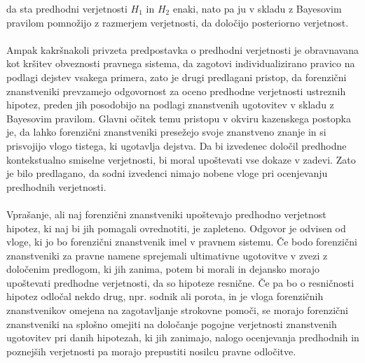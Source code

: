 \documentclass[12pt,a4paper]{amsart}
\theoremstyle{definition} %
\theoremstyle{plain} %
\begin{document}
da sta predhodni verjetnosti $H_1$ in $H_2$ enaki, nato pa ju v skladu z Bayesovim pravilom pomnožijo z razmerjem verjetnosti, da določijo posteriorno 
verjetnost. \\\\
Ampak kakršnakoli privzeta predpostavka o predhodni verjetnosti je obravnavana kot kršitev obveznosti pravnega sistema, da zagotovi individualizirano 
pravico na podlagi dejstev vsakega primera, zato je drugi predlagani pristop, da forenzični znanstveniki prevzamejo odgovornost za oceno predhodne 
verjetnosti ustreznih hipotez, preden jih posodobijo na podlagi znanstvenih ugotovitev v skladu z Bayesovim pravilom. Glavni očitek temu pristopu v 
okviru kazenskega postopka je, da lahko forenzični znanstveniki presežejo svoje znanstveno znanje in si prisvojijo vlogo tistega, ki ugotavlja 
dejstva. Da bi izvedenec določil predhodne kontekstualno smiselne verjetnosti, bi moral upoštevati vse dokaze v zadevi. Zato je bilo predlagano, 
da sodni izvedenci nimajo nobene vloge pri ocenjevanju predhodnih verjetnosti. \\\\
Vprašanje, ali naj forenzični znanstveniki upoštevajo predhodno verjetnost hipotez, ki naj bi jih pomagali ovrednotiti, je zapleteno. Odgovor je odvisen od 
vloge, ki jo bo forenzični znanstvenik imel v pravnem sistemu. Če bodo forenzični znanstveniki za pravne namene sprejemali ultimativne ugotovitve v zvezi z 
določenim predlogom, ki jih zanima, potem bi morali in dejansko morajo upoštevati predhodne verjetnosti, da so hipoteze resnične. Če pa bo o 
resničnosti hipotez odločal nekdo drug, npr. sodnik ali porota, in je vloga forenzičnih znanstvenikov omejena na zagotavljanje strokovne pomoči, se 
morajo forenzični znanstveniki na splošno omejiti na določanje pogojne verjetnosti znanstvenih ugotovitev pri danih hipotezah, ki jih zanimajo, nalogo 
ocenjevanja predhodnih in poznejših verjetnosti pa morajo prepustiti nosilcu pravne odločitve.
\end{document}
